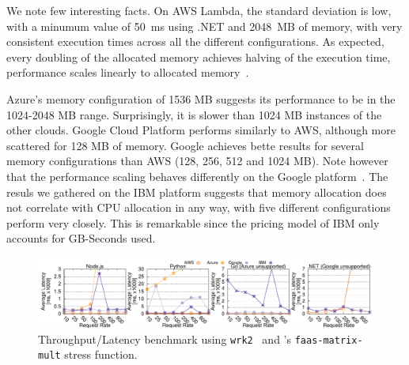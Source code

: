 We note few interesting facts.
On \gls{AWS} Lambda, the standard deviation is low, with a minumum value of 50~ms using .NET and  2048~MB of memory, with very consistent execution times across all the different configurations. 
As expected, every doubling of the allocated memory achieves halving of the execution time, performance scales linearly to allocated memory~\cite{AWSLambdaConfig}. 

Azure's memory configuration of 1536 \gls{MB} suggests its performance to be in the 1024-2048 \gls{MB} range.
Surprisingly, it is slower than 1024 \gls{MB} instances of the other clouds.  
Google Cloud Platform performs similarly to \gls{AWS}, although more scattered for 128 \gls{MB} of memory. 
Google achieves bette results for several memory configurations than \gls{AWS} (128, 256, 512 and 1024 \gls{MB}). %
Note however that the performance scaling behaves differently on the Google platform~\cite{GoogleFunctionsPricing}.
The resuls we gathered on the \gls{IBM} platform suggests that memory allocation does not correlate with \gls{CPU} allocation in any way, with five different configurations perform very closely. 
This is remarkable since the pricing model of \gls{IBM} only accounts for GB-Seconds used. 

\begin{figure}[!t]
\centering
\includegraphics[scale=0.7]{bilder/loadtest_average_latency/tputlat_combined.pdf}
\caption{Throughput/Latency benchmark using \texttt{wrk2}~\cite{wrk2} and \sys's  \texttt{faas-matrix-mult} stress function.
}
\label{fig:load_test_latency_all}
\end{figure}

